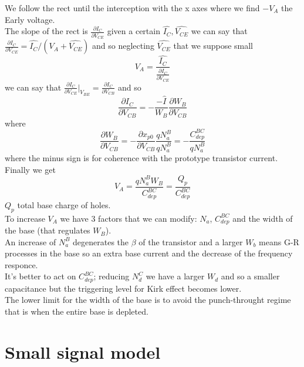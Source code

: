 We follow the rect until the interception with the x axes where we find $-V_A$ the Early voltage.\\
The slope of the rect is $\frac{\partial I_C}{\partial V_{CE}}$ given a certain $\hat{I_C},\hat{V_{CE}}$ we can say that $\frac{\partial I_C}{\partial V_{CE}}=\hat{I_C}/(V_A+\hat{V_{CE}})$ and so neglecting $\hat{V_{CE}}$ that we suppose small
\begin{equation}
V_A=\frac{\hat{I_C}}{\frac{\partial I_C}{\partial V_{CE}}}
\end{equation}
we can say that $\frac{\partial I_C}{\partial V_{CE}}|_{V_{BE}}=\frac{\partial I_C}{\partial V_{CB}}$ and so
\begin{equation}
\frac{\partial I_C}{\partial V_{CB}}=-\frac{-\hat{I}}{W_B}\frac{\partial W_B }{\partial V_{CB}}
\end{equation}  
where
\begin{equation}
\frac{\partial W_B }{\partial V_{CB}}=-\frac{\partial x_{p0}}{\partial V_{CB}}\frac{qN_a^B}{qN_a^B}=-\frac{C_{dep}^{BC}}{qN_a^B}
\end{equation}
where the minus sign is for coherence with the prototype transistor current.
Finally we get
\begin{equation}
V_A=\frac{qN_a^BW_B}{C_{dep}^{BC}}=\frac{Q_p}{C_{dep}^{BC}}
\end{equation}
$Q_p$ total base charge of holes.\\
\vspace{5mm}
To increase $V_A$ we have 3 factors that we can modify: $N_a$, $C_{dep}^{BC}$ and the width of the base (that regulates $W_B$).\\
An increase of $N_a^B$ degenerates the $\beta$ of the transistor and a larger $W_b$ means G-R processes in the base so an extra base current and the decrease of the frequency responce.\\
It's better to act on $C_{dep}^{BC}$; reducing $N_d^C$ we have a larger $W_d$ and so a smaller capacitance but the triggering level for Kirk effect becomes lower.\\
\vspace{5mm}
The lower limit for the width of the base is to avoid the punch-throught regime that is when the entire base is depleted.\\

\section{Small signal model}

